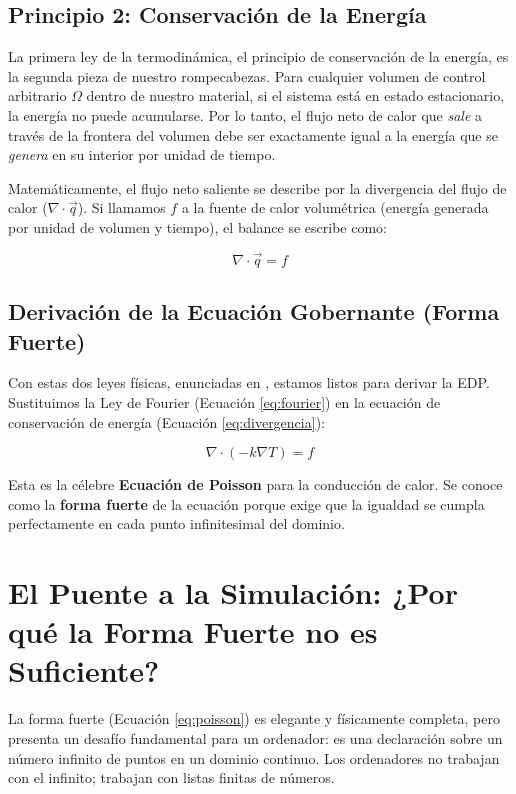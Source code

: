 \documentclass[11pt, a4paper]{article}
\begin{document}
\subsection{Principio 2: Conservación de la Energía}
La primera ley de la termodinámica, el principio de conservación de la energía, es la segunda pieza de nuestro rompecabezas. Para cualquier volumen de control arbitrario $\Omega$ dentro de nuestro material, si el sistema está en estado estacionario, la energía no puede acumularse. Por lo tanto, el flujo neto de calor que \textit{sale} a través de la frontera del volumen debe ser exactamente igual a la energía que se \textit{genera} en su interior por unidad de tiempo.

Matemáticamente, el flujo neto saliente se describe por la divergencia del flujo de calor ($\nabla \cdot \vec{q}$). Si llamamos $f$ a la fuente de calor volumétrica (energía generada por unidad de volumen y tiempo), el balance se escribe como:

\begin{equation}
    \nabla \cdot \vec{q} = f
    \label{eq:divergencia}
\end{equation}

\subsection{Derivación de la Ecuación Gobernante (Forma Fuerte)}
Con estas dos leyes físicas, enunciadas en \cite{incropera2007}, estamos listos para derivar la EDP. Sustituimos la Ley de Fourier (Ecuación \ref{eq:fourier}) en la ecuación de conservación de energía (Ecuación \ref{eq:divergencia}):

\begin{equation}
    \nabla \cdot (-k \nabla T) = f
    \label{eq:poisson}
\end{equation}

Esta es la célebre \textbf{Ecuación de Poisson} para la conducción de calor. Se conoce como la \textbf{forma fuerte} de la ecuación porque exige que la igualdad se cumpla perfectamente en cada punto infinitesimal del dominio.

\newpage

\section{El Puente a la Simulación: ¿Por qué la Forma Fuerte no es Suficiente?}
La forma fuerte (Ecuación \ref{eq:poisson}) es elegante y físicamente completa, pero presenta un desafío fundamental para un ordenador: es una declaración sobre un número infinito de puntos en un dominio continuo. Los ordenadores no trabajan con el infinito; trabajan con listas finitas de números.
\end{document}
